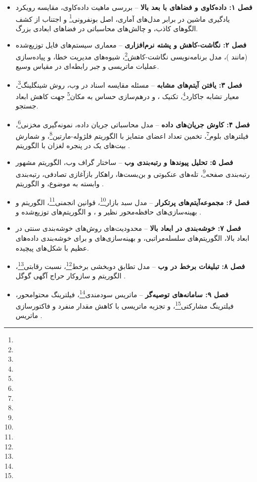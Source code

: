 \begin{itemize}
    \item \textbf{فصل ۱: داده‌کاوی و فضاهای با بعد بالا} -- بررسی ماهیت داده‌کاوی، مقایسه رویکرد یادگیری ماشین در برابر مدل‌های آماری، اصل بونفرونی\footnote{} و اجتناب از کشف الگوهای کاذب، و چالش‌های محاسباتی در فضاهای ابعادی بزرگ.
    \item \textbf{فصل ۲: نگاشت-کاهش و پشته نرم‌افزاری} -- معماری سیستم‌های فایل توزیع‌شده (مانند )، مدل برنامه‌نویسی نگاشت-کاهش\footnote{}، شیوه‌های مدیریت خطا، و پیاده‌سازی عملیات ماتریسی و جبر رابطه‌ای در مقیاس وسیع.
    \item \textbf{فصل ۳: یافتن آیتم‌های مشابه} -- مسئله مقایسه اسناد در وب، روش شینگلینگ\footnote{}، معیار تشابه جاکارد\footnote{}، تکنیک ، و درهم‌سازی حساس به مکان\footnote{} جهت کاهش ابعاد جستجو.
    \item \textbf{فصل ۴: کاوش جریان‌های داده} -- مدل محاسباتی جریان داده، نمونه‌گیری مخزنی\footnote{}، فیلترهای بلوم\footnote{}، تخمین تعداد اعضای متمایز با الگوریتم فلژوله-مارتین\footnote{}، و شمارش بیت‌های یک در پنجره لغزان با الگوریتم .
    \item \textbf{فصل ۵: تحلیل پیوندها و رتبه‌بندی وب} -- ساختار گراف وب، الگوریتم مشهور رتبه‌بندی صفحه\footnote{}، تله‌های عنکبوتی و بن‌بست‌ها، راهکار بازآغازی تصادفی، رتبه‌بندی وابسته به موضوع، و الگوریتم .
    \item \textbf{فصل ۶: مجموعه‌آیتم‌های پرتکرار} -- مدل سبد بازار\footnote{}، قوانین انجمنی\footnote{}، الگوریتم  و بهینه‌سازی‌های حافظه‌محور نظیر  و ، و الگوریتم‌های توزیع‌شده  و .
    \item \textbf{فصل ۷: خوشه‌بندی در ابعاد بالا} -- محدودیت‌های روش‌های خوشه‌بندی سنتی در ابعاد بالا، الگوریتم‌های سلسله‌مراتبی،  و بهینه‌سازی‌های  و  برای خوشه‌بندی داده‌های عظیم با شکل‌های پیچیده.
    \item \textbf{فصل ۸: تبلیغات برخط در وب} -- مدل تطابق دوبخشی برخط\footnote{}، نسبت رقابتی\footnote{}، الگوریتم  و سازوکار حراج آگهی گوگل .
    \item \textbf{فصل ۹: سامانه‌های توصیه‌گر} -- ماتریس سودمندی\footnote{}، فیلترینگ محتوامحور، فیلترینگ مشارکتی\footnote{}، و تجزیه ماتریسی با کاهش مقدار منفرد  و فاکتورسازی ماتریس .

\end{itemize}
